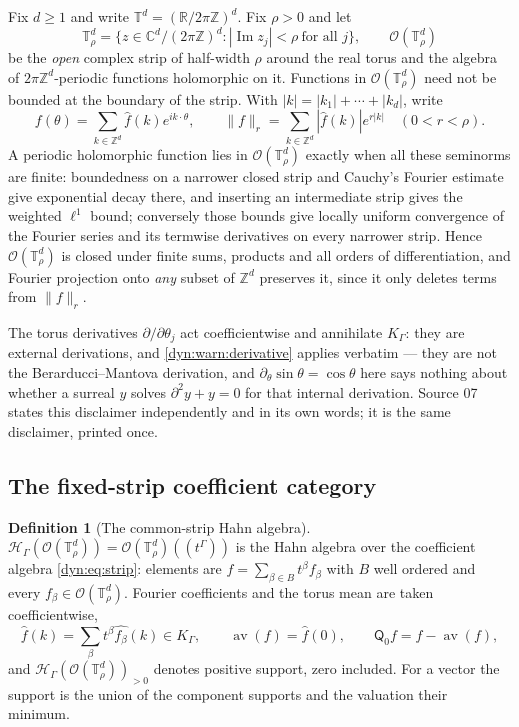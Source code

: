 \documentclass[11pt,letterpaper]{article}
\theoremstyle{definition}
\newtheorem{definition}[definition]{Definition}
\theoremstyle{remark}
\newcommand{\C}{\mathbb C}
\newcommand{\R}{\mathbb R}
\newcommand{\Z}{\mathbb Z}
\newcommand{\HH}{\mathscr H}
\newcommand{\OO}{\mathcal O}
\newcommand{\TT}{\mathbb T}
\newcommand{\strip}{\OO(\TT^{d}_{\rho})}
\newcommand{\av}{\operatorname{av}}
\newcommand{\Qz}{\mathsf Q_{0}}
\numberwithin{equation}{section}
\begin{document}
Fix $d\ge1$ and write $\TT^{d}=(\R/2\pi\Z)^{d}$. Fix $\rho>0$ and let
\begin{equation}\label{dyn:eq:strip}
 \TT^{d}_\rho=\{z\in\C^{d}/(2\pi\Z)^{d}:|\operatorname{Im}z_j|<\rho\
 \text{for all }j\},\qquad \strip
\end{equation}
be the \emph{open} complex strip of half-width $\rho$ around the real torus
and the algebra of $2\pi\Z^{d}$-periodic functions holomorphic on it.
Functions in $\strip$ need not be bounded at the boundary of the strip.
With $|k|=|k_1|+\cdots+|k_d|$, write
\begin{equation}\label{dyn:eq:seminorm}
 f(\theta)=\sum_{k\in\Z^{d}}\widehat f(k)e^{ik\cdot\theta},
 \qquad
 \|f\|_{r}=\sum_{k\in\Z^{d}}|\widehat f(k)|e^{r|k|}\quad(0<r<\rho).
\end{equation}
A periodic holomorphic function lies in $\strip$ exactly when all these
seminorms are finite: boundedness on a narrower closed strip and Cauchy's
Fourier estimate give exponential decay there, and inserting an
intermediate strip gives the weighted $\ell^{1}$ bound; conversely those
bounds give locally uniform convergence of the Fourier series and its
termwise derivatives on every narrower strip. Hence $\strip$ is closed
under finite sums, products and all orders of differentiation, and Fourier
projection onto \emph{any} subset of $\Z^{d}$ preserves it, since it only
deletes terms from $\|f\|_{r}$.

The torus derivatives $\partial/\partial\theta_j$ act coefficientwise and
annihilate $K_\Gamma$: they are external derivations, and
\cref{dyn:warn:derivative} applies verbatim --- they are not the
Berarducci--Mantova derivation, and $\partial_\theta\sin\theta=\cos\theta$
here says nothing about whether a surreal $y$ solves $\partial^{2}y+y=0$
for that internal derivation. Source 07 states this disclaimer
independently and in its own words; it is the same disclaimer, printed
once.

\subsection{The fixed-strip coefficient category}
\label{dyn:subsec:qpstrip}

\begin{definition}[The common-strip Hahn algebra]\label{dyn:def:qpstrip}
$\HH_\Gamma(\strip)=\strip((t^{\Gamma}))$ is the Hahn algebra over the
coefficient algebra \eqref{dyn:eq:strip}: elements are
$f=\sum_{\beta\in B}t^{\beta}f_\beta$ with $B$ well ordered and every
$f_\beta\in\strip$. Fourier coefficients and the torus mean are taken
coefficientwise,
\[
 \widehat f(k)=\sum_\beta t^{\beta}\widehat{f_\beta}(k)\in K_\Gamma,
 \qquad \av(f)=\widehat f(0),\qquad \Qz f=f-\av(f),
\]
and $\HH_\Gamma(\strip)_{>0}$ denotes positive support, zero included. For
a vector the support is the union of the component supports and the
valuation their minimum.
\end{definition}
\end{document}
